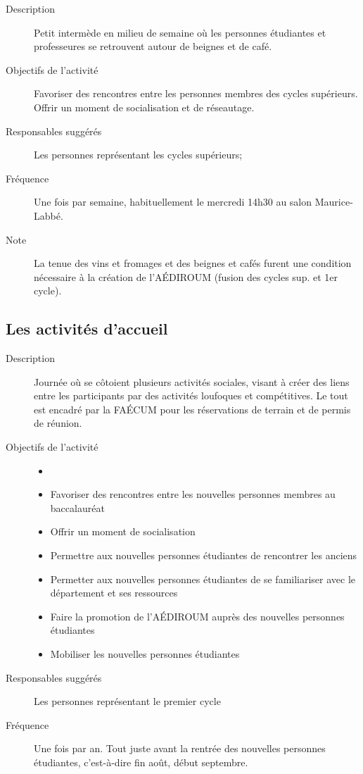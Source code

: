 \documentclass{aediroum}
\begin{document}
\begin{description}
    \item[Description] Petit intermède en milieu de semaine où les personnes étudiantes et professeures se retrouvent autour de beignes et de café.
    \item[Objectifs de l'activité] Favoriser des rencontres entre les personnes membres des cycles supérieurs. Offrir un moment de socialisation et de réseautage.
    \item[Responsables suggérés] Les personnes représentant les cycles supérieurs;
    \item[Fréquence] Une fois par semaine, habituellement le mercredi 14h30 au salon Maurice-Labbé.
    \item[Note] La tenue des vins et fromages et des beignes et cafés furent une condition nécessaire à la création de l'AÉDIROUM (fusion des cycles sup. et 1er cycle).
\end{description}

\subsection{Les activités d’accueil}\label{sec:activites-accueil}

\begin{description}
    \item[Description] Journée où se côtoient plusieurs activités sociales, visant à créer des liens entre les participants par des activités loufoques et compétitives. Le tout est encadré par la FAÉCUM pour les réservations de terrain et de permis de réunion.
    \item[Objectifs de l'activité]
    \begin{itemize}
        \item[]
        \item Favoriser des rencontres entre les nouvelles personnes membres au baccalauréat
        \item Offrir un moment de socialisation
        \item Permettre aux nouvelles personnes étudiantes de rencontrer les anciens
        \item Permetter aux nouvelles personnes étudiantes de se familiariser avec le département et ses ressources
        \item Faire la promotion de l'AÉDIROUM auprès des nouvelles personnes étudiantes
        \item Mobiliser les nouvelles personnes étudiantes
    \end{itemize}
    \item[Responsables suggérés] Les personnes représentant le premier cycle
    \item[Fréquence] Une fois par an. Tout juste avant la rentrée des nouvelles personnes étudiantes, c'est-à-dire fin août, début septembre.
\end{description}
\end{document}
